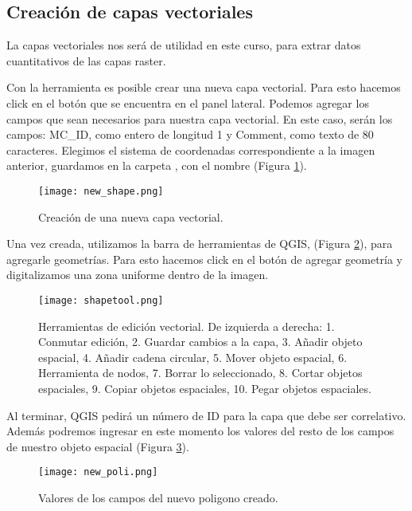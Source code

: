\subsection{Creaci\'on de capas vectoriales}

La capas vectoriales nos ser\'a de utilidad en este curso, para extrar datos
cuantitativos de las capas raster.

Con la herramienta  es posible crear una nueva
capa vectorial. Para esto hacemos click en el bot\'on que se
encuentra en el panel lateral. Podemos agregar los campos que sean necesarios
para nuestra capa vectorial. En este caso, ser\'an los campos: MC\_ID, como
entero de longitud 1 y Comment, como texto de 80 caracteres. Elegimos el sistema
de coordenadas correspondiente a la imagen anterior, guardamos en la carpeta
, con el nombre  (Figura \ref{fig:newshape}).

\begin{figure}[h!]
\begin{center}
    \texttt{[image: new\_shape.png]}
\end{center}
\caption{Creaci\'on de una nueva capa vectorial.}
\label{fig:newshape}
\end{figure}


Una vez creada, utilizamos la barra de herramientas de QGIS, (Figura \ref{fig:shapetool}),
para agregarle geometr\'ias. Para esto hacemos click en el bot\'on
de agregar geometr\'ia y digitalizamos una zona uniforme dentro de la imagen.
\begin{figure}[h!]
\begin{center}
    \texttt{[image: shapetool.png]}
\end{center}
\caption{Herramientas de edición vectorial. De izquierda a derecha: 1. Conmutar
    edici\'on, 2. Guardar cambios a la capa, 3. Añadir objeto espacial, 4. Añadir
    cadena circular, 5. Mover objeto espacial, 6. Herramienta de nodos, 7.
    Borrar lo seleccionado, 8. Cortar objetos espaciales, 9. Copiar objetos
    espaciales, 10. Pegar objetos espaciales.}
\label{fig:shapetool}
\end{figure}

Al terminar, QGIS pedir\'a un n\'umero de ID para la capa que debe ser
correlativo. Además podremos ingresar en este momento los valores del resto de
los campos de nuestro objeto espacial (Figura \ref{fig:newpoli}).

\begin{figure}[h!]
\begin{center}
\texttt{[image: new\_poli.png]}
\end{center}
\caption{Valores de los campos del nuevo poligono creado.}
\label{fig:newpoli}
\end{figure}

